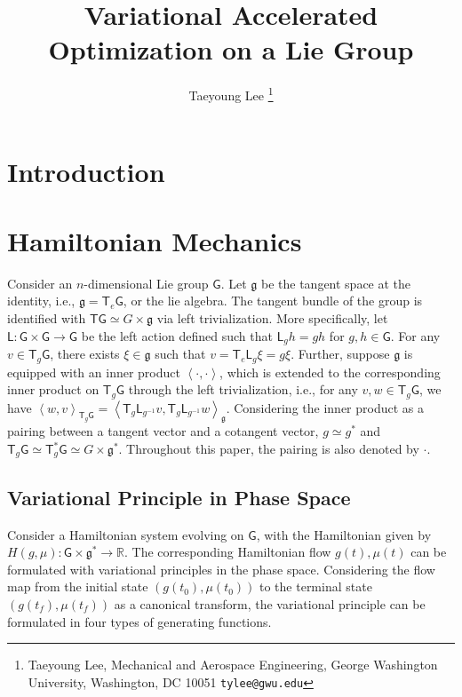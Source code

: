 \documentclass[letterpaper, 10pt, conference]{ieeeconf}
\title{\LARGE \bf Variational Accelerated Optimization on a Lie Group}
\author{Taeyoung Lee%
    \thanks{Taeyoung Lee, Mechanical and Aerospace Engineering, George Washington University, Washington, DC 10051 {\tt tylee@gwu.edu}}%
}
\newcommand{\G}{\ensuremath{\mathsf{G}}}
\newcommand{\T}{\ensuremath{\mathsf{T}}}
\renewcommand{\L}{\ensuremath{\mathsf{L}}}
\renewcommand{\Re}{\ensuremath{\mathbb{R}}}
\newcommand{\pair}[1]{\ensuremath{\left\langle #1 \right\rangle}}
\newcommand{\g}{\ensuremath{\mathfrak{g}}}
\begin{document}
\allowdisplaybreaks


\maketitle \thispagestyle{empty} \pagestyle{empty}

\begin{abstract}
\end{abstract}

\section{Introduction}

\section{Hamiltonian Mechanics}


Consider  an $n$-dimensional Lie group $\G$.
Let $\g$ be the tangent space at the identity, i.e., $\g = \T_e\G$, or the lie algebra. 
The tangent bundle of the group is identified with $\T\G \simeq G\times \g$ via left trivialization.
More specifically, let $\L:\G\times\G\rightarrow\G$ be the left action defined such that $\L_g h = gh$ for $g,h\in\G$.
For any $v\in\T_g\G$, there exists $\xi\in\g$ such that $v =\T_e\L_g \xi=g\xi$.
Further, suppose $\g$ is equipped with an inner product $\pair{\cdot, \cdot}$, which is extended to the corresponding inner product on $\T_g\G$ through the left trivialization, i.e., for any $v,w\in\T_g\G$, we have $\pair{w,v}_{\T_g\G} = \pair{ \T_g \L_{g^{-1}} v, \T_g \L_{g^{-1}} w}_\g$. 
Considering the inner product as a pairing between a tangent vector and a cotangent vector, $g\simeq g^*$ and $\T_g \G \simeq \T^*_g \G\simeq G\times \g^*$.
Throughout this paper, the pairing is also denoted by $\cdot$.

\subsection{Variational Principle in Phase Space}

Consider a Hamiltonian system evolving on $\G$, with the Hamiltonian given by $H(g,\mu): \G\times \g^* \rightarrow \Re$.
The corresponding Hamiltonian flow $g(t),\mu(t)$ can be formulated with variational principles in the phase space.
Considering the flow map from the initial state $(g(t_0),\mu(t_0))$ to the terminal state $(g(t_f),\mu(t_f))$ as a canonical transform, the variational principle can be formulated in four types of generating functions. 
\end{document}
